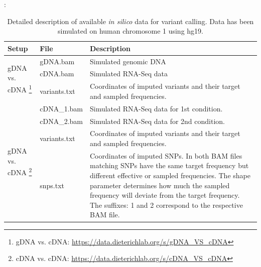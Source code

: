 \documentclass[10pt,a4paper]{article} \usepackage[utf8]{inputenc}
\begin{document}
:
\newcommand{\callRDD}{gDNA vs. cDNA: \url{https://data.dieterichlab.org/s/gDNA_VS_cDNA}}
\newcommand{\callRRD}{cDNA vs. cDNA: \url{https://data.dieterichlab.org/s/cDNA_VS_cDNA}}
\begin{table}
  \centering
  \caption{Detailed description of available \textit{in silico} data for variant calling. Data has been simulated on human chromosome 1 using hg19.}
  \label{tbl:call_data}
  {\small
  \begin{tabular}{llp{}}
    \textbf{Setup} & \textbf{File} & \textbf{Description} \\
    \hline
    \hline
    \multirow{3}{*}{gDNA vs. cDNA \footnote{\callRDD}} & gDNA.bam     & Simulated genomic DNA \\
                                                      & cDNA.bam     & Simulated RNA-Seq data \\
                                                      & variants.txt & Coordinates of imputed variants and their target 
                                                                          and sampled frequencies. \\
    \hline
    \multirow{4}{*}{gDNA vs. cDNA \footnote{\callRRD}} & cDNA\_1.bam  & Simulated RNA-Seq data for 1st condition. \\
                                                        & cDNA\_2.bam  & Simulated RNA-Seq data for 2nd condition. \\
                                                        & variants.txt & Coordinates of imputed variants and their target 
                                                                            and sampled frequencies. \\
                                                        & snps.txt     & Coordinates of imputed SNPs. In both BAM files 
                                                                            matching SNPs have the same target frequency but 
                                                                            different effective or sampled frequencies. The 
                                                                            shape parameter determines how much the sampled 
                                                                            frequency will deviate from the target frequency. 
                                                                            The suffixes: 1 and 2 correspond 
                                                                                to the respective BAM file.
  \end{tabular}}
  
\end{table}
\end{document}
